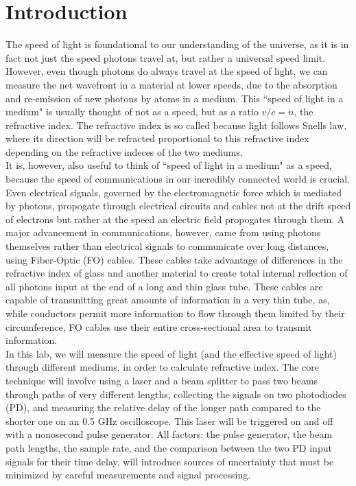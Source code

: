 \documentclass[aps,prl,reprint]{revtex4-2}
\begin{document}
\section{Introduction}
The speed of light is foundational to our understanding of the universe, as it is in
fact not just the speed photons travel at, but rather a universal speed limit. 
However, even though photons do always travel at the speed of light, we can measure 
the net wavefront in a material at lower speeds, due to the absorption and re-emission
of new photons by atoms in a medium. This ``speed of light in a medium" is usually
thought of not as a speed, but as a ratio $v/c=n$, the refractive index. The 
refractive index is so called because light follows Snells law, where its direction
will be refracted proportional to this refractive index depending on the refractive
indeces of the two mediums.\\

It is, however, also useful to think of ``speed of light in a medium" as a speed, 
because the speed of communications in our incredibly connected world is crucial. 
Even electrical signals, governed by the electromagnetic force which is mediated by
photons, propogate through electrical circuits and cables not at the drift speed of
electrons but rather at the speed an electric field propogates through them. A major
advancement in communications, however, came from using photons themselves rather
than electrical signals to communicate over long distances, using Fiber-Optic (FO) 
cables. These cables take advantage of differences in the refractive index of glass
and another material to create total internal reflection of all photons input at the
end of a long and thin glass tube. These cables are capable of transmitting great 
amounts of information in a very thin tube, as, while conductors permit more 
information to flow through them limited by their circumference, FO cables use their
entire cross-sectional area to transmit information. \\

In this lab, we will measure the speed of light (and the effective speed of light) 
through different mediums, in order to calculate refractive index. The core technique
will involve using a laser and a beam splitter to pass two beams through paths of 
very different lengths, collecting the signals on two photodiodes (PD), and measuring
the relative delay of the longer path compared to the shorter one on an 0.5 GHz
oscilloscope. This laser will be triggered on and off with a nonosecond pulse 
generator. All factors: the pulse generator, the beam path lengths, the sample rate,
and the comparison between the two PD input signals for their time delay, will 
introduce sources of uncertainty that must be minimized by careful measurements and
signal processing. \\
\end{document}
